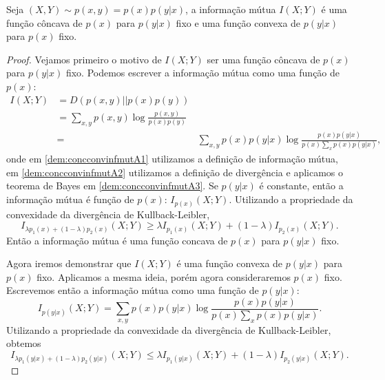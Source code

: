 \begin{theorem}\label{thm:concconvinfmut}
Seja $(X,Y) \sim p(x,y) = p(x)p(y|x)$, a informação mútua $I(X;Y)$ é uma função côncava
de $p(x)$ para $p(y|x)$ fixo e uma função convexa de $p(y|x)$ para $p(x)$ fixo.
\end{theorem}
\begin{proof}
Vejamos primeiro o motivo de $I(X;Y)$ ser uma função côncava de $p(x)$ para $p(y|x)$ fixo.
Podemos escrever a informação mútua como uma função de $p(x)$:
\begin{subequations}\label{dem:concconvinfmutA}
\begin{align}
    I(X;Y) &= D(p(x,y)||p(x)p(y)) \label{dem:concconvinfmutA1} \\
       &= \sum_{x,y} p(x,y) \log \frac{p(x,y)}{p(x)p(y)} \label{dem:concconvinfmutA2}\\
       &=& \sum_{x,y} p(x)p(y|x) \log \frac{ p(x)p(y|x) }{p(x) \sum_x p(x) p(y|x)}, \label{dem:concconvinfmutA3}
\end{align}
\end{subequations}
onde em \ref{dem:concconvinfmutA1} utilizamos a definição de informação mútua, 
em \ref{dem:concconvinfmutA2} utilizamos a definição de divergência e aplicamos o teorema de Bayes em \ref{dem:concconvinfmutA3}.
Se $p(y|x)$ é constante, então a informação mútua é função de $p(x)$: $I_{p(x)} (X;Y)$.
Utilizando a propriedade da convexidade da divergência de Kullback-Leibler,
\begin{equation}\label{eq-Imixpx}
I_{\lambda p_1(x) + (1-\lambda)p_2(x)} (X;Y) \geq \lambda I_{p_1(x)} (X;Y) + (1-\lambda) I_{p_2(x)} (X;Y) .
\end{equation}
Então a informação mútua é uma função concava de $p(x)$ para $p(y|x)$ fixo.

Agora iremos demonstrar que $I(X;Y)$ é uma função convexa de $p(y|x)$ para $p(x)$ fixo.
Aplicamos a mesma ideia, porém agora consideraremos $p(x)$ fixo. Escrevemos então a informação mútua como uma função de $p(y|x)$:
\begin{equation}
I_{p(y|x)} (X;Y) = \sum_{x,y} p(x) p(y|x) \log \frac{p(x) p(y|x)}{p(x) \sum_x p(x) p(y|x)} .
\end{equation}
Utilizando a propriedade da convexidade da divergência de Kullback-Leibler, obtemos
\begin{equation}\label{eq-Imixpxy}
I_{\lambda p_1(y|x) + (1-\lambda)p_2(y|x)} (X;Y) \leq \lambda I_{p_1(y|x)} (X;Y) + (1-\lambda) I_{p_2(y|x)} (X;Y) .
\end{equation}
\end{proof}




